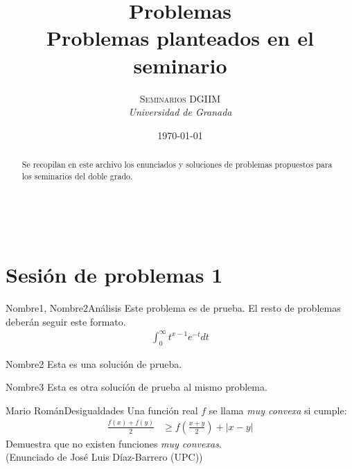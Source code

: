 \documentclass[a4paper, 11pt]{article} %
\title{\textbf{Problemas}\\ %
Problemas planteados en el seminario} %
\author{\textsc{Seminarios DGIIM} %
\\{\textit{Universidad de Granada}}} %
\date{\today} %
\makeatletter
\renewcommand{\maketitle}{ %
\begin{flushright} %
    {\LARGE\@title} %
    
    \vspace{50pt} %
    
    {\large\@author} %
    \\\@date %
    
    \vspace{40pt} %
\end{flushright}
}
\numberwithin{prbcounter}{section}
\makeatother
\begin{document}
\maketitle %



\renewcommand{\abstractname}{Resumen} %
\begin{abstract}
  Se recopilan en este archivo los enunciados y soluciones de problemas
  propuestos para los seminarios del doble grado.
\end{abstract}
{\parskip=2pt
  \tableofcontents
}
\pagebreak


\section{Sesión de problemas 1}

  
  \begin{enunciado}{Nombre1, Nombre2}{Análisis}
    Este problema es de prueba. El resto de problemas deberán seguir este formato.
    \begin{gather*}
      \int^\infty_0 t^{x-1} e^{-t} dt
    \end{gather*}
  \end{enunciado}

  \begin{solucion}{Nombre2}
    Esta es una solución de prueba. 
  \end{solucion}

  \begin{solucion}{Nombre3}
    Esta es otra solución de prueba al mismo problema. 
  \end{solucion}
  
  
  \begin{enunciado}{Mario Román}{Desigualdades}
    Una función real $f$ se llama \textit{muy convexa} si cumple:
    \begin{align*}
      \frac{f(x)+f(y)}{2} & \geq  f\left(\frac{x+y}{2}\right) + |x - y|
    \end{align*}
    Demuestra que no existen funciones \textit{muy convexas}. \\
    (Enunciado de José Luis Díaz-Barrero (UPC))
  \end{enunciado}
\end{document}
